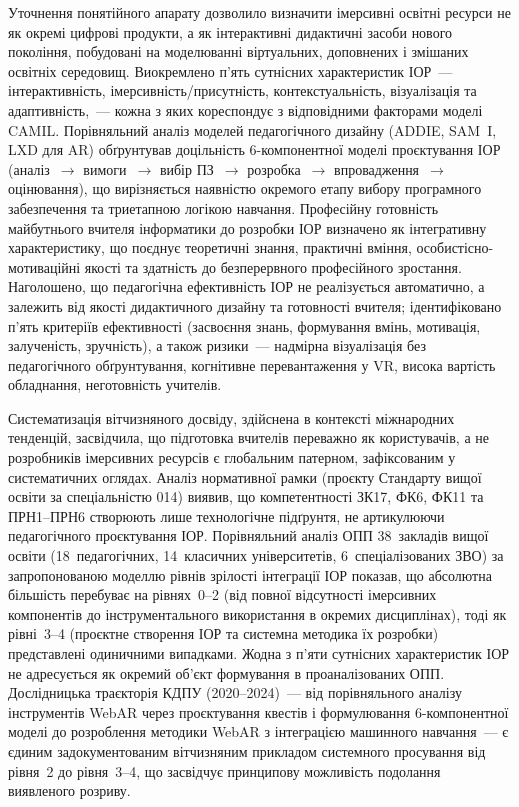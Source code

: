 Уточнення понятійного апарату дозволило визначити імерсивні освітні ресурси не як окремі цифрові продукти, а як інтерактивні дидактичні засоби нового покоління, побудовані на моделюванні віртуальних, доповнених і змішаних освітніх середовищ. Виокремлено п'ять сутнісних характеристик ІОР~--- інтерактивність, імерсивність/присутність, контекстуальність, візуалізація та адаптивність,~--- кожна з яких кореспондує з відповідними факторами моделі CAMIL. Порівняльний аналіз моделей педагогічного дизайну (ADDIE, SAM~I, LXD для AR) обґрунтував доцільність 6-компонентної моделі проєктування ІОР (аналіз~$\to$ вимоги~$\to$ вибір ПЗ~$\to$ розробка~$\to$ впровадження~$\to$ оцінювання), що вирізняється наявністю окремого етапу вибору програмного забезпечення та триетапною логікою навчання. Професійну готовність майбутнього вчителя інформатики до розробки ІОР визначено як інтегративну характеристику, що поєднує теоретичні знання, практичні вміння, особистісно-мотиваційні якості та здатність до безперервного професійного зростання. Наголошено, що педагогічна ефективність ІОР не реалізується автоматично, а залежить від якості дидактичного дизайну та готовності вчителя; ідентифіковано п'ять критеріїв ефективності (засвоєння знань, формування вмінь, мотивація, залученість, зручність), а також ризики~--- надмірна візуалізація без педагогічного обґрунтування, когнітивне перевантаження у VR, висока вартість обладнання, неготовність учителів.

Систематизація вітчизняного досвіду, здійснена в контексті міжнародних тенденцій, засвідчила, що підготовка вчителів переважно як користувачів, а не розробників імерсивних ресурсів є глобальним патерном, зафіксованим у систематичних оглядах. Аналіз нормативної рамки (проєкту Стандарту вищої освіти за спеціальністю 014) виявив, що компетентності ЗК17, ФК6, ФК11 та ПРН1--ПРН6 створюють лише технологічне підґрунтя, не артикулюючи педагогічного проєктування ІОР. Порівняльний аналіз ОПП 38~закладів вищої освіти (18~педагогічних, 14~класичних університетів, 6~спеціалізованих ЗВО) за запропонованою моделлю рівнів зрілості інтеграції ІОР показав, що абсолютна більшість перебуває на рівнях~0--2 (від повної відсутності імерсивних компонентів до інструментального використання в окремих дисциплінах), тоді як рівні~3--4 (проєктне створення ІОР та системна методика їх розробки) представлені одиничними випадками. Жодна з п'яти сутнісних характеристик ІОР не адресується як окремий об'єкт формування в проаналізованих ОПП. Дослідницька траєкторія КДПУ (2020--2024)~--- від порівняльного аналізу інструментів WebAR через проєктування квестів і формулювання 6-компонентної моделі до розроблення методики WebAR з інтеграцією машинного навчання~--- є єдиним задокументованим вітчизняним прикладом системного просування від рівня~2 до рівня~3--4, що засвідчує принципову можливість подолання виявленого розриву.

